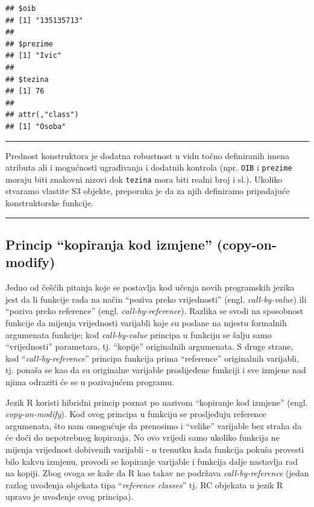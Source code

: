\documentclass[]{book}
\theoremstyle{definition}
\theoremstyle{definition}
\theoremstyle{definition}
\theoremstyle{remark}
\begin{document}
\begin{verbatim}
## $oib
## [1] "135135713"
## 
## $prezime
## [1] "Ivic"
## 
## $tezina
## [1] 76
## 
## attr(,"class")
## [1] "Osoba"
\end{verbatim}

\begin{center}\rule{0.5\linewidth}{\linethickness}\end{center}

Prednost konstruktora je dodatna robustnost u vidu točno definiranih
imena atributa ali i mogućnosti ugrađivanja i dodatnih kontrola (npr.
\texttt{OIB} i \texttt{prezime} moraju biti znakovni nizovi dok
\texttt{tezina} mora biti realni broj i sl.). Ukoliko stvaramo vlastite
S3 objekte, preporuka je da za njih definiramo pripadajuće
konstruktorske funkcije.

\begin{center}\rule{0.5\linewidth}{\linethickness}\end{center}

\subsection{\texorpdfstring{Princip ``kopiranja kod izmjene''
(copy-on-modify)}{Princip kopiranja kod izmjene (copy-on-modify)}}\label{princip-kopiranja-kod-izmjene-copy-on-modify}

Jedno od češćih pitanja koje se postavlja kod učenja novih programskih
jezika jest da li funkcije rada na način ``poziva preko vrijednosti''
(engl. \emph{call-by-value}) ili ``poziva preko reference'' (engl.
\emph{call-by-reference}). Razlika se svodi na sposobnost funkcije da
mijenja vrijednosti varijabli koje su poslane na mjestu formalnih
argumenata funkcije; kod \emph{call-by-value} principa u funkciju se
šalju samo ``vrijednosti'' parametara, tj. ``kopije'' originalnih
argumenata. S druge strane, kod ``\emph{call-by-reference}'' principa
funkcija prima ``reference'' originalnih varijabli, tj. ponaša se kao da
su originalne varijable proslijeđene funkciji i sve izmjene nad njima
odraziti će se u pozivajućem programu.

Jezik R koristi hibridni princip poznat po nazivom ``kopiranje kod
izmjene'' (engl. \emph{copy-on-modify}). Kod ovog principa u funkciju se
prosljeđuju reference argumenata, što nam omogućuje da prenosimo i
``velike'' varijable bez straha da će doći do nepotrebnog kopiranja. No
ovo vrijedi samo ukoliko funkcija ne mijenja vrijednost dobivenih
varijabli - u trenutku kada funkcija pokuša provesti bilo kakvu izmjenu,
provodi se kopiranje varijable i funkcija dalje nastavlja rad na kopiji.
Zbog ovoga se kaže da R kao takav ne podržava \emph{call-by-reference}
(jedan razlog uvođenja objekata tipa ``\emph{reference classes}'' tj. RC
objekata u jezik R upravo je uvođenje ovog principa).
\end{document}
